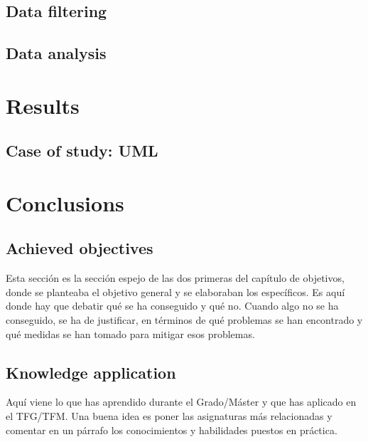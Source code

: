 \documentclass[a4paper, 12pt]{book}
\begin{document}
\section{Data filtering}
\label{sec:filtro-datos}
\section{Data analysis}
\label{sec:analisis-datos}
\cleardoublepage
\chapter{Results}
\section{Case of study: UML}
\label{sec:caso-estudio-uml}
\cleardoublepage
\chapter{Conclusions}
\label{chap:conclusiones}
\section{Achieved objectives}
\label{sec:consecucion-objetivos}
Esta sección es la sección espejo de las dos primeras del capítulo de objetivos,
donde se planteaba el objetivo general y se elaboraban los específicos.
Es aquí donde hay que debatir qué se ha conseguido y qué no. Cuando algo no
se ha conseguido, se ha de justificar, en términos de qué problemas se han
encontrado y qué medidas se han tomado para mitigar esos problemas.
\section{Knowledge application}
\label{sec:aplicacion}
Aquí viene lo que has aprendido durante el Grado/Máster y que has aplicado
en el TFG/TFM. Una buena idea es poner las asignaturas más relacionadas y
comentar en un párrafo los conocimientos y habilidades puestos en práctica.
\end{document}
